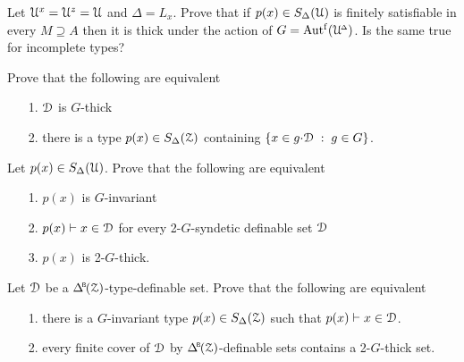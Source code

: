 
\begin{exercise}
  Let $\EuScript U^x=\EuScript U^z=\EuScript U$ and $\Delta=L_x$.
  Prove that if $p(x)\in S_\Delta(\EuScript U)$ is finitely satisfiable in every $M\supseteq A$ then it is thick under the action of $G=\mbox{Aut$^{\rm f}$}(\EuScript U\kern-.2ex^{\scriptscriptstyle\Delta})$.
  Is the same true for incomplete types?
\end{exercise}

\begin{exercise}
  Prove that the following are equivalent
  \begin{itemize}
    \item[1.] $\EuScript D$ is $G$-thick
    \item[2.] there is a type $p(x)\in S_\Delta(\EuScript Z)$ containing $\{x\in g{\cdot}\EuScript D\;:\;g\in G\}$.
  \end{itemize}
\end{exercise}

\begin{exercise}
  Let $p(x)\in S_\Delta(\EuScript U)$.
  Prove that the following are equivalent
  \begin{itemize}
    \item[1.] $p(x)$ is $G$-invariant
    \item[2.] $p(x)\vdash x\in\EuScript D$ for every 2-$G$-syndetic definable set $\EuScript D$
    \item[3.] $p(x)$ is 2-$G$-thick.
  \end{itemize}
\end{exercise}

\begin{exercise}
  Let $\EuScript D$ be a $\BDelta(\Z)$-type-definable set.
  Prove that the following are equivalent 
  \begin{itemize}
    \item[1.] there is a $G$-invariant type $p(x)\in S_\Delta(\EuScript Z)$ such that $p(x)\vdash x\in\EuScript D$.
    \item[2.] every finite cover of $\EuScript D$ by $\BDelta(\Z)$-definable sets contains a 2-$G$-thick set.
  \end{itemize}
\end{exercise}


